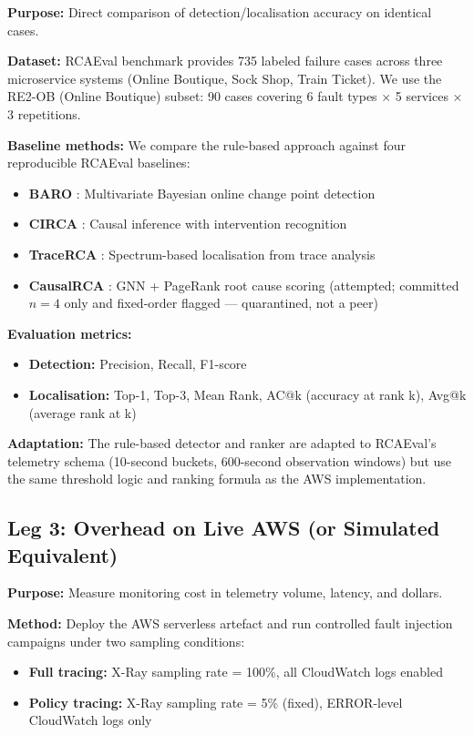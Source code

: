 \textbf{Purpose:} Direct comparison of detection/localisation accuracy on identical cases.

\textbf{Dataset:} RCAEval benchmark \citep{pham2025rcaeval} provides 735 labeled failure cases across three microservice systems (Online Boutique, Sock Shop, Train Ticket). We use the RE2-OB (Online Boutique) subset: 90 cases covering 6 fault types × 5 services × 3 repetitions.

\textbf{Baseline methods:} We compare the rule-based approach against four reproducible RCAEval baselines:
\begin{itemize}
    \item \textbf{BARO} \citep{pham2024baro}: Multivariate Bayesian online change point detection
    \item \textbf{CIRCA} \citep{li2022circa}: Causal inference with intervention recognition
    \item \textbf{TraceRCA} \citep{li2021tracerca}: Spectrum-based localisation from trace analysis
    \item \textbf{CausalRCA} \citep{xin2023causalrca}: GNN + PageRank root cause scoring (attempted; committed $n{=}4$ only and fixed-order flagged --- quarantined, not a peer)
\end{itemize}

\textbf{Evaluation metrics:}
\begin{itemize}
    \item \textbf{Detection:} Precision, Recall, F1-score
    \item \textbf{Localisation:} Top-1, Top-3, Mean Rank, AC@k (accuracy at rank k), Avg@k (average rank at k)
\end{itemize}

\textbf{Adaptation:} The rule-based detector and ranker are adapted to RCAEval's telemetry schema (10-second buckets, 600-second observation windows) but use the same threshold logic and ranking formula as the AWS implementation.

\subsection{Leg 3: Overhead on Live AWS (or Simulated Equivalent)}

\textbf{Purpose:} Measure monitoring cost in telemetry volume, latency, and dollars.

\textbf{Method:} Deploy the AWS serverless artefact and run controlled fault injection campaigns under two sampling conditions:
\begin{itemize}
    \item \textbf{Full tracing:} X-Ray sampling rate = 100\%, all CloudWatch logs enabled
    \item \textbf{Policy tracing:} X-Ray sampling rate = 5\% (fixed), ERROR-level CloudWatch logs only
\end{itemize}

